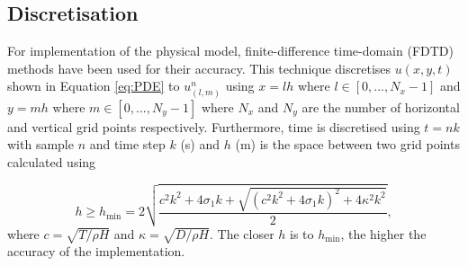 \documentclass{vgtc}
\begin{document}
\subsection{Discretisation}
For implementation of the physical model, finite-difference time-domain (FDTD) methods have been used for their accuracy. This technique discretises $u(x,y,t)$ shown in Equation \eqref{eq:PDE} to $u_{(l,m)}^n$ using $x=lh$ where $l \in [0, ..., N_x-1]$ and $y=mh$ where $m \in [0, ..., N_y-1]$ where $N_x$ and $N_y$ are the number of horizontal and vertical grid points respectively. Furthermore, time is discretised using $t = nk$ with sample $n$ and time step $k$ (s) and $h$ (m) is the space between two grid points calculated using 

\begin{equation}\label{eq:h}
    h \geq h_\text{min} =  2\sqrt{\frac{c^2k^2 + 4\sigma_1k + \sqrt{(c^2k^2 + 4\sigma_1k)^2 + 4\kappa^2 k^2} }{2}},
\end{equation}
where $c = \sqrt{T/\rho H}$ and $\kappa = \sqrt{D/\rho H}$. The closer $h$ is to $h_\text{min}$, the higher the accuracy of the implementation.
\end{document}
